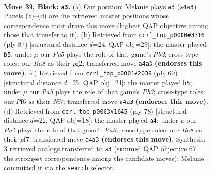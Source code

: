 \documentclass[11pt]{article}
\begin{document}
\clearpage

\begin{figure}[p]\centering
\begin{subfigure}{0.46\textwidth}\centering
\resizebox{\linewidth}{!}{%
\newchessgame
\chessboard[
  setfen={r7/8/4kp2/3p4/p7/3Q2P1/P4PKP/4q3 b - - 1 39},
  showmover=false,
  pgfstyle=straightmove, color=movearrow, markmove={a4-a3}
]}
\caption{}
\end{subfigure}\hfill
\begin{subfigure}{0.46\textwidth}\centering
\resizebox{\linewidth}{!}{%
\newchessgame
\chessboard[
  setfen={6k1/1p3p2/p4Q2/2q5/2p5/4P2P/1P3PP1/7K b - - 2 44},
  showmover=false,
  pgfstyle=straightmove, color=movearrow, markmove={b7-b5}
]}
\caption{}
\end{subfigure}
\\[4pt]
\begin{subfigure}{0.46\textwidth}\centering
\resizebox{\linewidth}{!}{%
\newchessgame
\chessboard[
  setfen={6k1/5n2/q5pp/P1Q5/7P/6P1/5PK1/8 b - - 1 35},
  showmover=false,
  pgfstyle=straightmove, color=movearrow, markmove={h6-h5}
]}
\caption{}
\end{subfigure}\hfill
\begin{subfigure}{0.46\textwidth}\centering
\resizebox{\linewidth}{!}{%
\newchessgame
\chessboard[
  setfen={6k1/5p1p/6p1/1Q2p3/4q3/P6P/1P4PK/8 w - - 0 40},
  showmover=false,
  pgfstyle=straightmove, color=movearrow, markmove={a3-a4}
]}
\caption{}
\end{subfigure}
\caption{\textbf{Move 39, Black: \texttt{a3}.} (a) Our position; Melanie plays \texttt{a3} (\texttt{a4a3}). Panels (b)--(d) are the retrieved master positions whose correspondence most drove this move (highest QAP objective among those that transfer to it). (b) Retrieved from \texttt{ccrl\_top\_p0000\#3316} (ply 87) [structural distance $d$=24, QAP obj=29]: the master played \texttt{b5}; under $\mu$ our \emph{Pa5} plays the role of that game's \emph{Pb2}; cross-type roles: our \emph{R}a8 as their \emph{p}g2; transferred move \texttt{a4a3} \textbf{(endorses this move)}. (c) Retrieved from \texttt{ccrl\_top\_p0001\#2039} (ply 69) [structural distance $d$=25, QAP obj=21]: the master played \texttt{h5}; under $\mu$ our \emph{Pa5} plays the role of that game's \emph{Ph3}; cross-type roles: our \emph{P}f6 as their \emph{N}f7; transferred move \texttt{a4a3} \textbf{(endorses this move)}. (d) Retrieved from \texttt{ccrl\_top\_p0003\#1645} (ply 78) [structural distance $d$=22, QAP obj=18]: the master played \texttt{a4}; under $\mu$ our \emph{Pa5} plays the role of that game's \emph{Pa3}; cross-type roles: our \emph{R}a8 as their \emph{p}f7; transferred move \texttt{a4a3} \textbf{(endorses this move)}. Synthesis: 3 retrieved analogs transferred to \texttt{a3} (summed QAP objective 67, the strongest correspondence among the candidate moves); Melanie committed it via the \texttt{search} selector.}
\label{fig:thought-m77}
\end{figure}
\end{document}
